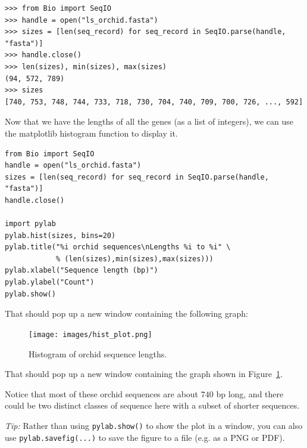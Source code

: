 \documentclass{report}
\begin{document}
\begin{verbatim}
>>> from Bio import SeqIO
>>> handle = open("ls_orchid.fasta")
>>> sizes = [len(seq_record) for seq_record in SeqIO.parse(handle, "fasta")]
>>> handle.close()
>>> len(sizes), min(sizes), max(sizes)
(94, 572, 789)
>>> sizes
[740, 753, 748, 744, 733, 718, 730, 704, 740, 709, 700, 726, ..., 592]
\end{verbatim}

Now that we have the lengths of all the genes (as a list of integers), we can use the
matplotlib histogram function to display it.

\begin{verbatim}
from Bio import SeqIO
handle = open("ls_orchid.fasta")
sizes = [len(seq_record) for seq_record in SeqIO.parse(handle, "fasta")]
handle.close()

import pylab
pylab.hist(sizes, bins=20)
pylab.title("%i orchid sequences\nLengths %i to %i" \
            % (len(sizes),min(sizes),max(sizes)))
pylab.xlabel("Sequence length (bp)")
pylab.ylabel("Count")
pylab.show()
\end{verbatim}

%
%
\begin{htmlonly}
\noindent That should pop up a new window containing the following graph:


\end{htmlonly}
%
%
\begin{latexonly}
\begin{figure}[htbp]
\centering
\texttt{[image: images/hist\_plot.png]}
\caption{Histogram of orchid sequence lengths.}
\label{fig:seq-len-hist}
\end{figure}
\noindent That should pop up a new window containing the graph
shown in Figure~\ref{fig:seq-len-hist}.
\end{latexonly}
%
%
Notice that most of these orchid sequences are about $740$ bp long, and there could be
two distinct classes of sequence here with a subset of shorter sequences.

\emph{Tip:} Rather than using \verb|pylab.show()| to show the plot in a window, you can also use \verb|pylab.savefig(...)| to save the figure to a file (e.g. as a PNG or PDF).
\end{document}
